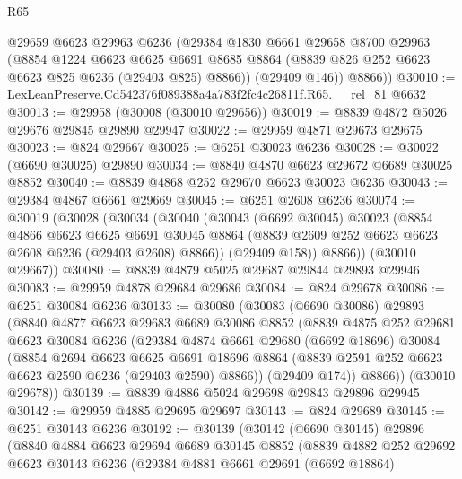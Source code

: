 \begin{lexlean}{R65}
\begin{coremodule}
{        @29659
        @6623
        @29963
        @6236
        (@29384
          @1830
          @6661
          @29658
          @8700
          @29963
          (@8854
            @1224
            @6623
            @6625
            @6691
            @8685
            @8864
            (@8839 @826 @252 @6623 @6623 @825 @6236 (@29403 @825) @8866))
          (@29409 @146))
        @8866))
@30010 := LexLeanPreserve.Cd542376f089388a4a783f2fc4c26811f.R65.__rel_81 @6632
@30013 := @29958 (@30008 (@30010 @29656))
@30019 := @8839 @4872 @5026 @29676 @29845 @29890 @29947
@30022 := @29959 @4871 @29673 @29675
@30023 := @824 @29667
@30025 := @6251 @30023 @6236
@30028 := @30022 (@6690 @30025) @29890
@30034 := @8840 @4870 @6623 @29672 @6689 @30025 @8852
@30040 := @8839 @4868 @252 @29670 @6623 @30023 @6236
@30043 := @29384 @4867 @6661 @29669
@30045 := @6251 @2608 @6236
@30074 := @30019
    (@30028
      (@30034
        (@30040
          (@30043
            (@6692 @30045)
            @30023
            (@8854
              @4866
              @6623
              @6625
              @6691
              @30045
              @8864
              (@8839 @2609 @252 @6623 @6623 @2608 @6236 (@29403 @2608) @8866))
            (@29409 @158))
          @8866))
      (@30010 @29667))
@30080 := @8839 @4879 @5025 @29687 @29844 @29893 @29946
@30083 := @29959 @4878 @29684 @29686
@30084 := @824 @29678
@30086 := @6251 @30084 @6236
@30133 := @30080
    (@30083
      (@6690 @30086)
      @29893
      (@8840
        @4877
        @6623
        @29683
        @6689
        @30086
        @8852
        (@8839
          @4875
          @252
          @29681
          @6623
          @30084
          @6236
          (@29384
            @4874
            @6661
            @29680
            (@6692 @18696)
            @30084
            (@8854
              @2694
              @6623
              @6625
              @6691
              @18696
              @8864
              (@8839 @2591 @252 @6623 @6623 @2590 @6236 (@29403 @2590) @8866))
            (@29409 @174))
          @8866))
      (@30010 @29678))
@30139 := @8839 @4886 @5024 @29698 @29843 @29896 @29945
@30142 := @29959 @4885 @29695 @29697
@30143 := @824 @29689
@30145 := @6251 @30143 @6236
@30192 := @30139
    (@30142
      (@6690 @30145)
      @29896
      (@8840
        @4884
        @6623
        @29694
        @6689
        @30145
        @8852
        (@8839
          @4882
          @252
          @29692
          @6623
          @30143
          @6236
          (@29384
            @4881
            @6661
            @29691
            (@6692 @18864)
}
\end{coremodule}
\end{lexlean}
